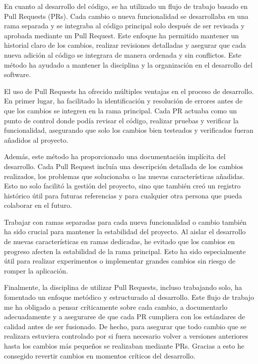 En cuanto al desarrollo del código, se ha utilizado un flujo de trabajo basado en Pull Requests (PRs). Cada cambio o nueva 
funcionalidad se desarrollaba en una rama separada y se integraba al código principal solo después de ser revisada y aprobada 
mediante un Pull Request. Este enfoque ha permitido mantener un historial claro de los cambios, realizar revisiones detalladas y 
asegurar que cada nueva adición al código se integrara de manera ordenada y sin conflictos. Este método ha ayudado a mantener la disciplina y la organización en el
 desarrollo del software.

El uso de Pull Requests ha ofrecido múltiples ventajas en el proceso de desarrollo. En primer lugar, ha facilitado la identificación y 
resolución de errores antes de que los cambios se integren en la rama principal. Cada PR actuaba como un punto de control donde podía revisar 
el código, realizar pruebas y verificar la funcionalidad, asegurando que solo los cambios bien testeados y verificados fueran añadidos al proyecto.

Además, este método ha proporcionado una documentación implícita del desarrollo. Cada Pull Request incluía una descripción detallada de los 
cambios realizados, los problemas que solucionaba o las nuevas características añadidas. Esto no solo facilitó la gestión del proyecto, sino 
que también creó un registro histórico útil para futuras referencias y para cualquier otra persona que pueda colaborar en el futuro.

Trabajar con ramas separadas para cada nueva funcionalidad o cambio también ha sido crucial para mantener la estabilidad del proyecto. Al aislar el 
desarrollo de nuevas características en ramas dedicadas, he evitado que los cambios en progreso afecten la estabilidad de la rama principal. Esto ha 
sido especialmente útil para realizar experimentos o implementar grandes cambios sin riesgo de romper la aplicación.

Finalmente, la disciplina de utilizar Pull Requests, incluso trabajando solo, ha fomentado un enfoque metódico y estructurado al desarrollo. Este 
flujo de trabajo me ha obligado a pensar críticamente sobre cada cambio, a documentarlo adecuadamente y a asegurarse de que cada PR cumpliera con los 
estándares de calidad antes de ser fusionado. De hecho, para asegurar que todo cambio que se realizara estuviera controlado por si fuera necesario volver a versiones anteriores
hasta los cambios más pequeños se realizaban mediante PRs. Gracias a esto he consegido revertir cambios en momentos críticos del desarrollo.

